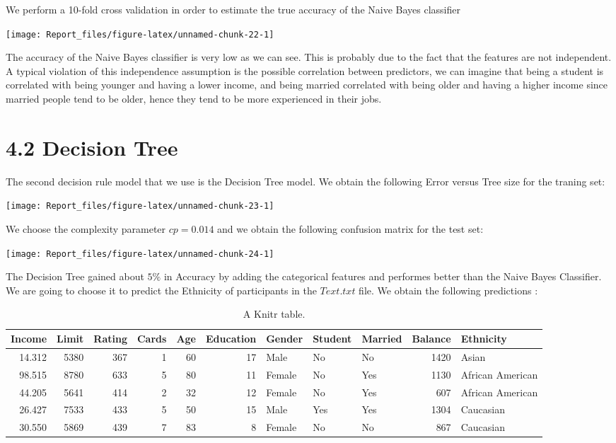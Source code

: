 \documentclass[]{article}
\begin{document}
We perform a 10-fold cross validation in order to estimate the true
accuracy of the Naive Bayes classifier

\begin{center}\texttt{[image: Report\_files/figure-latex/unnamed-chunk-22-1]} \end{center}

The accuracy of the Naive Bayes classifier is very low as we can see.
This is probably due to the fact that the features are not independent.
A typical violation of this independence assumption is the possible
correlation between predictors, we can imagine that being a student is
correlated with being younger and having a lower income, and being
married correlated with being older and having a higher income since
married people tend to be older, hence they tend to be more experienced
in their jobs.

\section{4.2 Decision Tree}\label{decision-tree-1}

The second decision rule model that we use is the Decision Tree model.
We obtain the following Error versus Tree size for the traning set:

\begin{center}\texttt{[image: Report\_files/figure-latex/unnamed-chunk-23-1]} \end{center}

We choose the complexity parameter \(cp = 0.014\) and we obtain the
following confusion matrix for the test set:

\begin{center}\texttt{[image: Report\_files/figure-latex/unnamed-chunk-24-1]} \end{center}

The Decision Tree gained about \(5\%\) in Accuracy by adding the
categorical features and performes better than the Naive Bayes
Classifier. We are going to choose it to predict the Ethnicity of
participants in the \(Text.txt\) file. We obtain the following
predictions :

\begin{table}

\caption{\label{tab:unnamed-chunk-25}A Knitr table.}
\centering
\begin{tabular}[t]{r|r|r|r|r|r|l|l|l|r|l}
\hline
Income & Limit & Rating & Cards & Age & Education & Gender & Student & Married & Balance & Ethnicity\\
\hline
14.312 & 5380 & 367 & 1 & 60 & 17 & Male & No & No & 1420 & Asian\\
\hline
98.515 & 8780 & 633 & 5 & 80 & 11 & Female & No & Yes & 1130 & African American\\
\hline
44.205 & 5641 & 414 & 2 & 32 & 12 & Female & No & Yes & 607 & African American\\
\hline
26.427 & 7533 & 433 & 5 & 50 & 15 & Male & Yes & Yes & 1304 & Caucasian\\
\hline
30.550 & 5869 & 439 & 7 & 83 & 8 & Female & No & No & 867 & Caucasian\\
\hline
\end{tabular}
\end{table}
\end{document}
